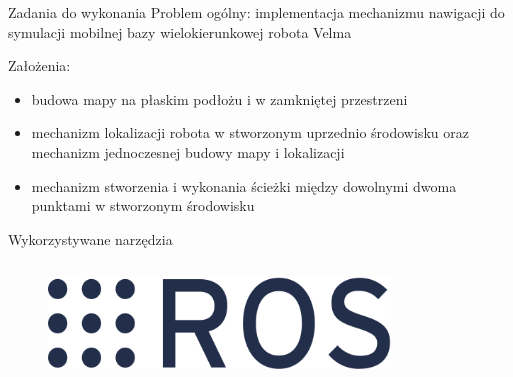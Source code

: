 \begin{frame}
{Zadania do wykonania}
Problem ogólny: implementacja mechanizmu nawigacji do symulacji mobilnej bazy wielokierunkowej robota Velma

Założenia:
	\begin{itemize}
		\item budowa mapy na płaskim podłożu i w zamkniętej przestrzeni
		\item mechanizm lokalizacji robota w stworzonym uprzednio środowisku oraz mechanizm jednoczesnej budowy mapy i lokalizacji
		\item mechanizm stworzenia i wykonania ścieżki między dowolnymi dwoma punktami w stworzonym środowisku
	\end{itemize}
\end{frame}

\begin{frame}
{Wykorzystywane narzędzia}
	\begin{columns}
		\begin{column}{0.25\textwidth}
			\begin{figure}
				\begin{center}
					\includegraphics[width=\textwidth]{img/Ros_logo.png}
				\end{center}
			\end{figure}
		\end{column}
		\begin{column}{0.25\textwidth}  %
						\begin{figure}
				\begin{center}

\end{center}
\end{figure}
\end{column}
\end{columns}
\end{frame}

